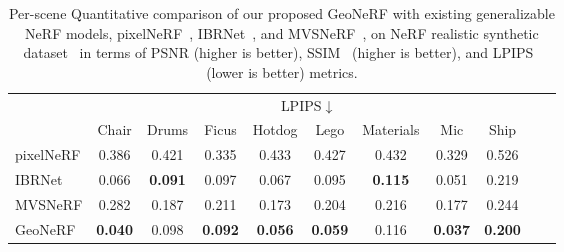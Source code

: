 \begin{table}[!t]
    \vspace{1.0ex}

    \begin{center}
        \begin{threeparttable}
            \begin{tabular}{l|cccccccccc}
            & \multicolumn{8}{c}{LPIPS$\downarrow$} \\
            &  Chair & Drums & Ficus & Hotdog & Lego & Materials & Mic & Ship \\
            \hline
            pixelNeRF & 0.386 & 0.421 & 0.335 & 0.433 & 0.427 & 0.432 & 0.329 & 0.526 \\
            IBRNet & 0.066 & \textbf{0.091} & 0.097 & 0.067 & 0.095 & \textbf{0.115} & 0.051 & 0.219 \\
            MVSNeRF & 0.282 & 0.187 & 0.211 & 0.173 & 0.204 & 0.216 & 0.177 & 0.244 \\
            GeoNeRF & \textbf{0.040} & 0.098 & \textbf{0.092} & \textbf{0.056} & \textbf{0.059} & 0.116 & \textbf{0.037} & \textbf{0.200} \\
            \hline
            \end{tabular}
        \end{threeparttable}
    \end{center}
    \vspace{3.0ex}
    \caption{Per-scene Quantitative comparison of our proposed GeoNeRF with existing generalizable NeRF models, pixelNeRF~\citep{yu2021pixelnerf}, IBRNet~\citep{wang2021ibrnet}, and MVSNeRF~\citep{chen2021mvsnerf}, on NeRF realistic synthetic dataset~\citep{mildenhall2020nerf} in terms of PSNR (higher is better), SSIM~\citep{wang2004image} (higher is better), and LPIPS~\citep{zhang2018unreasonable} (lower is better) metrics.}
    \label{table:per_scene_no_ft_nerf}
\end{table}

\clearpage

